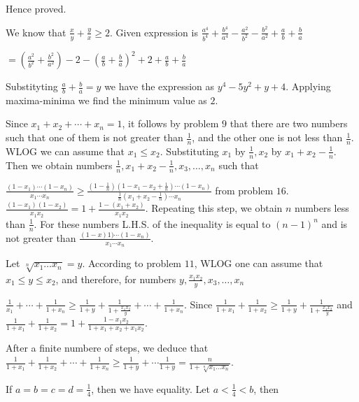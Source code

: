   Hence proved.
\item We know that $\frac{x}{y} + \frac{y}{x}\geq 2$. Given expression is $\frac{a^4}{b^4} + \frac{b^4}{a^4}
  - \frac{a^2}{b^2} - \frac{b^2}{a^2} + \frac{a}{b} + \frac{b}{a}$

  $= \left(\frac{a^2}{b^2} + \frac{b^2}{a^2}\right) - 2 - \left(\frac{a}{b} + \frac{b}{a}\right)^2 + 2 +
  \frac{a}{b}+ \frac{b}{a}$

  Substityting $\frac{a}{b} + \frac{b}{a} = y$ we have the expression as $y^4 - 5y^2 + y + 4$. Applying
  maxima-minima we find the minimum value as $2$.
\item Since $x_1 + x_2 + \cdots + x_n = 1$, it follows by problem $9$ that there are two numbers such that
  one of them is not greater than $\frac{1}{n}$, and the other one is not less than $\frac{1}{n}$. WLOG we
  can assume that $x_1\leq x_2$. Substituting $x_1$ by $\frac{1}{n}, x_2$ by $x_1 + x_2 - \frac{1}{n}$. Then
  we obtain numbers $\frac{1}{n}, x_1 + x_2 - \frac{1}{n}, x_3, \ldots, x_n$ such that

  $\frac{(1 - x_1)\cdots(1 - x_n)}{x_1\cdots x_n}\geq \frac{\left(1 - \frac{1}{n}\right)\left(1 - x_1 - x_2
    + \frac{1}{n}\right)\cdots(1 - x_n)}{\frac{1}{n}\left(x_1 + x_2 - \frac{1}{n}\right)\cdots
    x_n}$ from problem $16$. $\frac{(1 - x_1)(1 - x_2)}{x_1x_2} = 1 + \frac{1 - (x_1 +
    x_2)}{x_1x_2}$. Repeating this step, we obtain $n$ numbers less than $\frac{1}{n}$. For these numbers
  L.H.S. of the inequality is equal to $(n - 1)^n$ and is not greater than $\frac{(1 - x)1)\cdots(1 -
    x_n)}{x_1\cdots x_n}$.
\item Let $\sqrt[n]{x_1\ldots x_n} = y$. According to problem $11$, WLOG one can assume that $x_1\leq y\leq
  x_2$, and therefore, for numbers $y, \frac{x_1x_2}{y}, x_3, \ldots, x_n$

  $\frac{1}{x_1} + \cdots + \frac{1}{1 + x_n}\geq \frac{1}{1 + y} + \frac{1}{1 + \frac{x_1x_2}{y}} + \cdots
  + \frac{1}{1 + x_n}$. Since $\frac{1}{1 + x_1} + \frac{1}{1 + x_2}\geq \frac{1}{1 + y} + \frac{1}{1 +
    \frac{x_1x_2}{y}}$ and $\frac{1}{1 + x_1} + \frac{1}{1 + x_2} = 1 + \frac{1 - x_1x_2}{1 + x_1 + x_2 +
    x_1x_2}$.

  After a finite numbere of steps, we deduce that $\frac{1}{1 + x_1} + \frac{1}{1 + x_2} + \cdots +
  \frac{1}{1 + x_n}\geq \frac{1}{1 + y} + \cdots \frac{1}{1 + y} = \frac{n}{1 + \sqrt[n]{x_1\ldots x_n}}$.
\item If $a = b = c = d = \frac{1}{4}$, then we have equality. Let $a < \frac{1}{4} < b$, then

